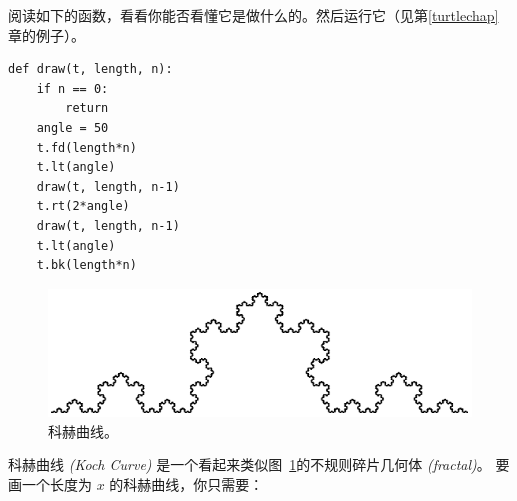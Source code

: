 {{{{\begin{exercise}
阅读如下的函数，看看你能否看懂它是做什么的。然后运行它（见第\ref{turtlechap}章的例子）。

\begin{em}
\begin{lstlisting}
def draw(t, length, n):
    if n == 0:
        return
    angle = 50
    t.fd(length*n)
    t.lt(angle)
    draw(t, length, n-1)
    t.rt(2*angle)
    draw(t, length, n-1)
    t.lt(angle)
    t.bk(length*n)
\end{lstlisting}
\end{em}

\end{exercise}


\begin{figure}
\centerline
{\includegraphics[scale=0.8]{../source/figs/koch.pdf}}
\caption{科赫曲线。}
\label{fig.koch}
\end{figure}


\begin{exercise}


科赫曲线 {\em (Koch Curve)} 是一个看起来类似图~\ref{fig.koch}的不规则碎片几何体 {\em (fractal)}。 要画一个长度为 $x$ 的科赫曲线，你只需要：



\end{exercise}}}}}
